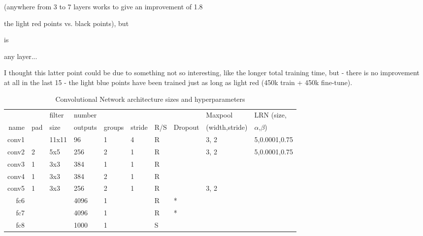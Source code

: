 \begin{enumerate}
 (anywhere from 3 to 7 layers works to give an improvement of 1.8%

the light red points vs. black points), but 

is 

any layer...

I thought this latter point could be due to something not so interesting, like the longer total training time, but
 - there is no improvement at all in the last 15%
 - the light blue points have been trained just as long as light red (450k train + 450k fine-tune).




\end{enumerate}

\begin{table}[t]
\caption{Convolutional Network architecture sizes and hyperparameters}
\label{tab:network_architecture}
\begin{center}
\begin{tabular}{|r|l|l|l|l|l|l|l|l|l|}
\hline
       &      & filter & number  &        &        &     &         & Maxpool        & LRN (size,        \\
name   & pad  & size   & outputs & groups & stride & R/S & Dropout & (width,stride) & $\alpha$,$\beta$) \\
\hline
conv1  &      & 11x11  & 96      & 1      & 4      & R   &         & 3, 2           & 5,0.0001,0.75     \\
conv2  & 2    & 5x5    & 256     & 2      & 1      & R   &         & 3, 2           & 5,0.0001,0.75     \\
conv3  & 1    & 3x3    & 384     & 1      & 1      & R   &         &                &                   \\
conv4  & 1    & 3x3    & 384     & 2      & 1      & R   &         &                &                   \\
conv5  & 1    & 3x3    & 256     & 2      & 1      & R   &         & 3, 2           &                   \\
fc6    &      &        & 4096    & 1      &        & R   & *       &                &                   \\
fc7    &      &        & 4096    & 1      &        & R   & *       &                &                   \\
fc8    &      &        & 1000    & 1      &        & S   &         &                &                   \\
\hline
\end{tabular}
\end{center}
\end{table}

